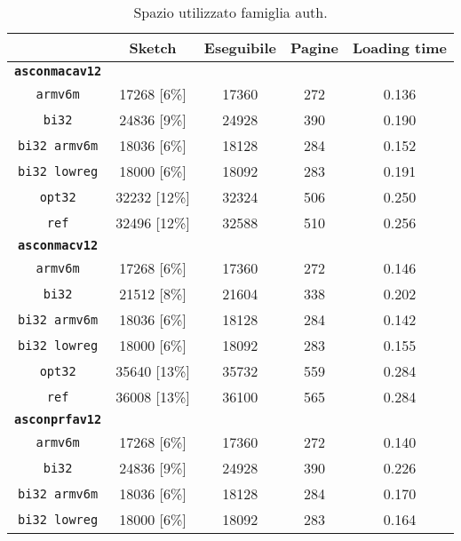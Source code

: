 \begin{table}[h]
    \caption{Spazio utilizzato famiglia auth.}
    \centering
    \begin{adjustbox}{width=304pt}
	\begin{tabular}{|c|c|c|c|c|}
		\hline
         & \textbf{Sketch} & \textbf{Eseguibile} & \textbf{Pagine} & \textbf{Loading time} \\
        \hline
        \texttt{\textbf{asconmacav12}} & & & & \\
        \hline
        \texttt{armv6m} & 17268 [6\%] & 17360 & 272 & 0.136 \\
        \hline
        \texttt{bi32} & 24836 [9\%] & 24928 & 390 & 0.190 \\
        \hline
        \texttt{bi32 armv6m} & 18036 [6\%] & 18128 & 284 & 0.152 \\
        \hline
        \texttt{bi32 lowreg} & 18000 [6\%] & 18092 & 283 & 0.191 \\
        \hline
        \texttt{opt32} & 32232 [12\%] & 32324 & 506 & 0.250 \\
        \hline
        \texttt{ref} & 32496 [12\%] & 32588 & 510 & 0.256 \\
        \hline
        \texttt{\textbf{asconmacv12}} & & & & \\
        \hline
        \texttt{armv6m} & 17268 [6\%] & 17360 & 272 & 0.146 \\
        \hline
        \texttt{bi32} & 21512 [8\%] & 21604 & 338 & 0.202 \\
        \hline
        \texttt{bi32 armv6m} & 18036 [6\%] & 18128 & 284 & 0.142 \\
        \hline
        \texttt{bi32 lowreg} & 18000 [6\%] & 18092 & 283 & 0.155 \\
        \hline
        \texttt{opt32} & 35640 [13\%] & 35732 & 559 & 0.284 \\
        \hline
        \texttt{ref} & 36008 [13\%] & 36100 & 565 & 0.284 \\
        \hline
        \texttt{\textbf{asconprfav12}} & & & & \\
        \hline
        \texttt{armv6m} & 17268 [6\%] & 17360 & 272 & 0.140 \\
        \hline
        \texttt{bi32} & 24836 [9\%] & 24928 & 390 & 0.226 \\
        \hline
        \texttt{bi32 armv6m} & 18036 [6\%] & 18128 & 284 & 0.170 \\
        \hline
        \texttt{bi32 lowreg} & 18000 [6\%] & 18092 & 283 & 0.164 \\

\end{tabular}
\end{adjustbox}
\end{table}

